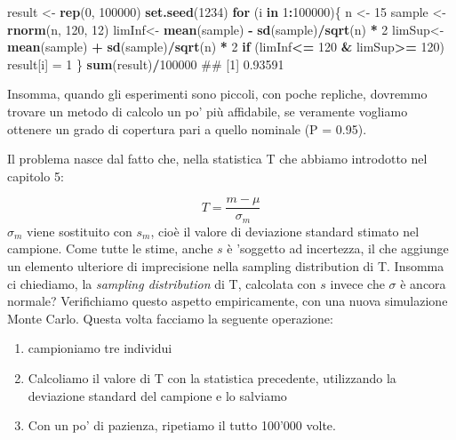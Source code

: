 \documentclass[a4paper,12pt,oneside]{book}
\providecommand{\tightlist}{%
  \setlength{\itemsep}{0pt}\setlength{\parskip}{0pt}}
\newenvironment{Shaded}{\begin{snugshade}}{\end{snugshade}}
\newcommand{\KeywordTok}[1]{\textcolor[rgb]{0.13,0.29,0.53}{\textbf{#1}}}
\newcommand{\DecValTok}[1]{\textcolor[rgb]{0.00,0.00,0.81}{#1}}
\newcommand{\StringTok}[1]{\textcolor[rgb]{0.31,0.60,0.02}{#1}}
\newcommand{\ControlFlowTok}[1]{\textcolor[rgb]{0.13,0.29,0.53}{\textbf{#1}}}
\newcommand{\OperatorTok}[1]{\textcolor[rgb]{0.81,0.36,0.00}{\textbf{#1}}}
\newcommand{\NormalTok}[1]{#1}
\theoremstyle{definition}
\theoremstyle{definition}
\theoremstyle{definition}
\theoremstyle{remark}
\begin{document}
\begin{Shaded}
\begin{Highlighting}[]
\NormalTok{result <-}\StringTok{ }\KeywordTok{rep}\NormalTok{(}\DecValTok{0}\NormalTok{, }\DecValTok{100000}\NormalTok{)}
\KeywordTok{set.seed}\NormalTok{(}\DecValTok{1234}\NormalTok{)}
\ControlFlowTok{for}\NormalTok{ (i }\ControlFlowTok{in} \DecValTok{1}\OperatorTok{:}\DecValTok{100000}\NormalTok{)\{}
\NormalTok{  n <-}\StringTok{ }\DecValTok{15}
\NormalTok{  sample <-}\StringTok{ }\KeywordTok{rnorm}\NormalTok{(n, }\DecValTok{120}\NormalTok{, }\DecValTok{12}\NormalTok{)}
\NormalTok{  limInf<-}\StringTok{ }\KeywordTok{mean}\NormalTok{(sample) }\OperatorTok{-}\StringTok{ }\KeywordTok{sd}\NormalTok{(sample)}\OperatorTok{/}\KeywordTok{sqrt}\NormalTok{(n) }\OperatorTok{*}\StringTok{ }\DecValTok{2} 
\NormalTok{  limSup<-}\StringTok{ }\KeywordTok{mean}\NormalTok{(sample) }\OperatorTok{+}\StringTok{ }\KeywordTok{sd}\NormalTok{(sample)}\OperatorTok{/}\KeywordTok{sqrt}\NormalTok{(n) }\OperatorTok{*}\StringTok{ }\DecValTok{2}
  \ControlFlowTok{if}\NormalTok{ (limInf}\OperatorTok{<=}\StringTok{ }\DecValTok{120} \OperatorTok{&}\StringTok{ }\NormalTok{limSup}\OperatorTok{>=}\StringTok{ }\DecValTok{120}\NormalTok{) result[i] =}\StringTok{ }\DecValTok{1}
\NormalTok{\}}
\KeywordTok{sum}\NormalTok{(result)}\OperatorTok{/}\DecValTok{100000}
\NormalTok{## [1] 0.93591}
\end{Highlighting}
\end{Shaded}

Insomma, quando gli esperimenti sono piccoli, con poche repliche,
dovremmo trovare un metodo di calcolo un po' più affidabile, se
veramente vogliamo ottenere un grado di copertura pari a quello nominale
(P = 0.95).

Il problema nasce dal fatto che, nella statistica T che abbiamo
introdotto nel capitolo 5:

\[T = \frac{m - \mu}{\sigma_m}\] \(\sigma_m\) viene sostituito con
\(s_m\), cioè il valore di deviazione standard stimato nel campione.
Come tutte le stime, anche \(s\) è 'soggetto ad incertezza, il che
aggiunge un elemento ulteriore di imprecisione nella sampling
distribution di T. Insomma ci chiediamo, la \emph{sampling distribution}
di T, calcolata con \(s\) invece che \(\sigma\) è ancora normale?
Verifichiamo questo aspetto empiricamente, con una nuova simulazione
Monte Carlo. Questa volta facciamo la seguente operazione:

\begin{enumerate}
\def\labelenumi{\arabic{enumi}.}
\tightlist
\item
  campioniamo tre individui
\item
  Calcoliamo il valore di T con la statistica precedente, utilizzando la
  deviazione standard del campione e lo salviamo
\item
  Con un po' di pazienza, ripetiamo il tutto 100'000 volte.
\end{enumerate}
\end{document}
